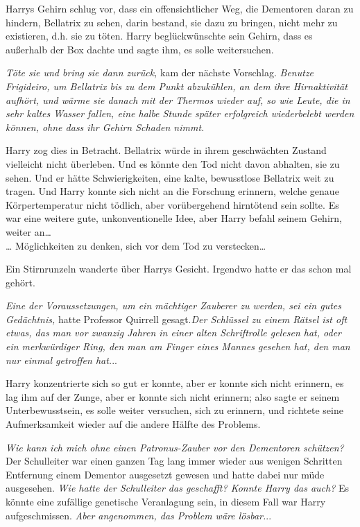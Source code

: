 {Harrys Gehirn schlug vor, dass ein offensichtlicher Weg, die Dementoren daran zu hindern, Bellatrix zu sehen, darin bestand, sie dazu zu bringen, nicht mehr zu existieren, d.h. sie zu töten. Harry beglückwünschte sein Gehirn, dass es außerhalb der Box dachte und sagte ihm, es solle weitersuchen.

\emph{Töte sie und bring sie dann zurück,} kam der nächste Vorschlag. \emph{Benutze Frigideiro, um Bellatrix bis zu dem Punkt abzukühlen, an dem ihre Hirnaktivität aufhört, und wärme sie danach mit der Thermos wieder auf, so wie Leute, die in sehr kaltes Wasser fallen, eine halbe Stunde später erfolgreich wiederbelebt werden können, ohne dass ihr Gehirn Schaden nimmt.}

Harry zog dies in Betracht. Bellatrix würde in ihrem geschwächten Zustand vielleicht nicht überleben. Und es könnte den Tod nicht davon abhalten, sie zu sehen. Und er hätte Schwierigkeiten, eine kalte, bewusstlose Bellatrix weit zu tragen. Und Harry konnte sich nicht an die Forschung erinnern, welche genaue Körpertemperatur nicht tödlich, aber vorübergehend hirntötend sein sollte. Es war eine weitere gute, unkonventionelle Idee, aber Harry befahl seinem Gehirn, weiter an…\\ … Möglichkeiten zu denken, sich vor dem Tod zu verstecken…

Ein Stirnrunzeln wanderte über Harrys Gesicht. Irgendwo hatte er das schon mal gehört.

\emph{Eine der Voraussetzungen, um ein mächtiger Zauberer zu werden, sei ein gutes Gedächtnis,} hatte Professor Quirrell gesagt.\emph{\hfill\break Der Schlüssel zu einem Rätsel ist oft etwas, das man vor zwanzig Jahren in einer alten Schriftrolle gelesen hat, oder ein merkwürdiger Ring, den man am Finger eines Mannes gesehen hat, den man nur einmal getroffen hat.}..

Harry konzentrierte sich so gut er konnte, aber er konnte sich nicht erinnern, es lag ihm auf der Zunge, aber er konnte sich nicht erinnern; also sagte er seinem Unterbewusstsein, es solle weiter versuchen, sich zu erinnern, und richtete seine Aufmerksamkeit wieder auf die andere Hälfte des Problems.

\emph{Wie kann ich mich ohne einen Patronus-Zauber vor den Dementoren schützen?}\\ Der Schulleiter war einen ganzen Tag lang immer wieder aus wenigen Schritten Entfernung einem Dementor ausgesetzt gewesen und hatte dabei nur müde ausgesehen. \emph{Wie hatte der Schulleiter das geschafft? Konnte Harry das auch?} Es könnte eine zufällige genetische Veranlagung sein, in diesem Fall war Harry aufgeschmissen. \emph{Aber angenommen, das Problem wäre lösbar.}..

}
